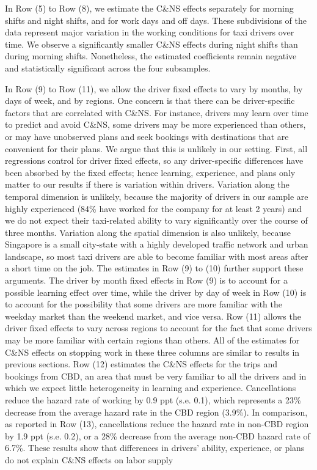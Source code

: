 \documentclass[reviewmode,AEJ]{AEA}
\begin{document}
In Row (5) to Row (8), we  estimate the C\&NS effects separately for morning shifts and night shifts, and for work days and off days. These subdivisions of the data represent major variation in the working conditions for taxi drivers over time. We observe a significantly smaller C\&NS effects during night shifts than during morning shifts. Nonetheless, the estimated coefficients remain negative and statistically significant across the four subsamples.


In Row (9) to Row (11), we allow the driver fixed effects to vary by months, by days of week, and by regions. One concern is that there can be driver-specific factors that  are correlated with C\&NS. For instance, drivers may learn over time to predict and avoid C\&NS, some drivers may be more experienced than others, or may have unobserved plans and seek bookings with destinations that are convenient for their plans. We argue that this is unlikely in our setting. First, all regressions control for driver fixed effects, so any driver-specific differences have been absorbed by the fixed effects;
hence learning, experience, and plans only matter to our results if there is variation within drivers. 
Variation along the temporal dimension is unlikely, because the majority of drivers in our sample are highly
experienced (84\% have worked for the company for at least 2 years) and we do not expect their taxi-related
ability to vary significantly over the course of three months. Variation along the spatial dimension is also
unlikely, because Singapore is a small city-state with a highly developed traffic network and urban landscape,
so most taxi drivers are able to become familiar with most areas after a short time on the job. The estimates in Row (9) to (10) further support these arguments. The driver by month fixed effects in Row (9) is to account for a possible learning effect over time, while the driver by day of week in Row (10) is to account for the possibility that some drivers are more familiar with the weekday market than the weekend market, and vice versa. Row (11) allows the driver fixed effects to vary across regions to account for the fact 
that some drivers may be more familiar with certain regions than others. All of the estimates for C\&NS effects
on stopping work in these three columns are %
similar to results in previous sections. Row (12) estimates the C\&NS effects for the trips and bookings from CBD, an area that must be very familiar to all the drivers and in which we expect little heterogeneity in
learning and experience. Cancellations reduce the hazard rate of working by 0.9 ppt (s.e. 0.1), which 
represents a 23\% decrease from the average hazard rate in the CBD region (3.9\%). In comparison, as
reported in Row (13), cancellations reduce the hazard rate in non-CBD region by 1.9 ppt (s.e. 0.2), 
or a 28\% decrease from the average non-CBD hazard rate of 6.7\%. These results show that differences in
drivers' ability, experience, or plans do not explain C\&NS effects on labor supply
\end{document}
